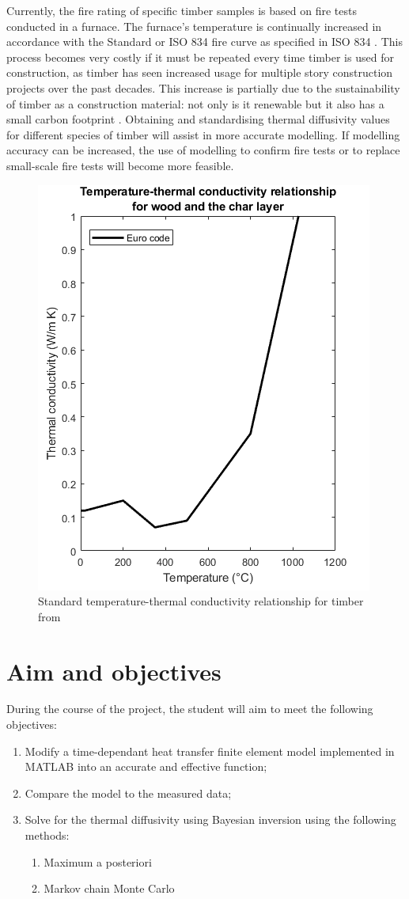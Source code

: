 Currently, the fire rating of specific timber samples is based on fire tests conducted in a furnace. 
The furnace's temperature is continually increased in accordance with the Standard or ISO 834 fire curve as specified in ISO 834 \citep{ISO:1999}.
This process becomes very costly if it must be repeated every time timber is used for construction, as timber has seen increased usage for multiple story construction projects over the past decades. 
This increase is partially due to the sustainability of timber as a construction material: not only is it renewable but it also has a small carbon footprint \citep{Salvadori:2017}.
Obtaining and standardising thermal diffusivity values for different species of timber will assist in more accurate modelling.
If modelling accuracy can be increased, the use of modelling to confirm fire tests or to replace small-scale fire tests will become more feasible.

	\begin{figure}
	\centering
	\includegraphics[width = 0.5\linewidth]{figures/Eurok.png}
	\caption{Standard temperature-thermal conductivity relationship for timber from \citep{Euro:2004}}
	\label{kvalue_fig}
	\end{figure}
	
	

\section{Aim and objectives}
During the course of the project, the student will aim to meet the following objectives:
\begin{enumerate}
 \item Modify a time-dependant heat transfer finite element model implemented in MATLAB into an accurate and effective function;
 \item Compare the model to the measured data;
 \item Solve for the thermal diffusivity using Bayesian inversion using the following methods:
 	\begin{enumerate}
 		\item Maximum a posteriori
 		\item Markov chain Monte Carlo 	
 	\end{enumerate}
\end{enumerate}


